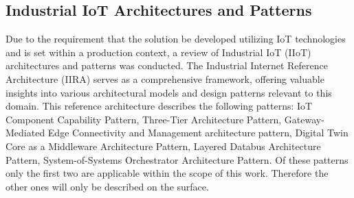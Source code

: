 \subsection{Industrial IoT Architectures and Patterns}
Due to the requirement that the solution be developed utilizing IoT technologies and is set within a production context, a review of Industrial IoT (IIoT) architectures and patterns was conducted. The Industrial Internet Reference Architecture (IIRA) \cite{youngIndustrialInternetReference2022} serves as a comprehensive framework, offering valuable insights into various architectural models and design patterns relevant to this domain. This reference architecture describes the following patterns: IoT Component Capability Pattern, Three-Tier Architecture Pattern, Gateway-Mediated Edge Connectivity and Management architecture pattern, Digital Twin Core as a Middleware Architecture Pattern, Layered Databus Architecture Pattern, System-of-Systems Orchestrator Architecture Pattern. Of these patterns only the first two are applicable within the scope of this work. Therefore the other ones will only be described on the surface.
